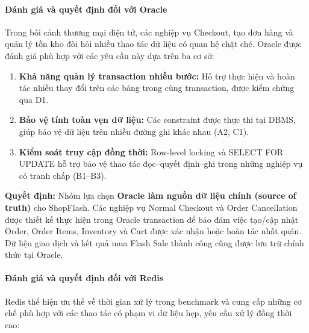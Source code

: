 \paragraph*{Đánh giá và quyết định đối với Oracle}

Trong bối cảnh thương mại điện tử, các nghiệp vụ Checkout, tạo đơn hàng và quản lý tồn kho đòi hỏi nhiều thao tác dữ liệu có quan hệ chặt chẽ. Oracle được đánh giá phù hợp với các yêu cầu này dựa trên ba cơ sở:

\begin{enumerate}[leftmargin=*,itemsep=2pt,topsep=4pt]
\item
\textbf{Khả năng quản lý transaction nhiều bước:} Hỗ trợ thực hiện và hoàn tác nhiều thay đổi trên các bảng trong cùng transaction, được kiểm chứng qua D1.

\item
\textbf{Bảo vệ tính toàn vẹn dữ liệu:} Các constraint được thực thi tại DBMS, giúp bảo vệ dữ liệu trên nhiều đường ghi khác nhau (A2, C1).

\item
\textbf{Kiểm soát truy cập đồng thời:} Row-level locking và SELECT FOR UPDATE hỗ trợ bảo vệ thao tác đọc–quyết định–ghi trong những nghiệp vụ có tranh chấp (B1–B3).

\end{enumerate}
\textbf{Quyết định:} Nhóm lựa chọn \textbf{Oracle làm nguồn dữ liệu chính (source of truth)} cho ShopFlash. Các nghiệp vụ Normal Checkout và Order Cancellation được thiết kế thực hiện trong Oracle transaction để bảo đảm việc tạo/cập nhật Order, Order Items, Inventory và Cart được xác nhận hoặc hoàn tác nhất quán. Dữ liệu giao dịch và kết quả mua Flash Sale thành công cũng được lưu trữ chính thức tại Oracle.

\paragraph*{Đánh giá và quyết định đối với Redis}

Redis thể hiện ưu thế về thời gian xử lý trong benchmark và cung cấp những cơ chế phù hợp với các thao tác có phạm vi dữ liệu hẹp, yêu cầu xử lý đồng thời cao:

